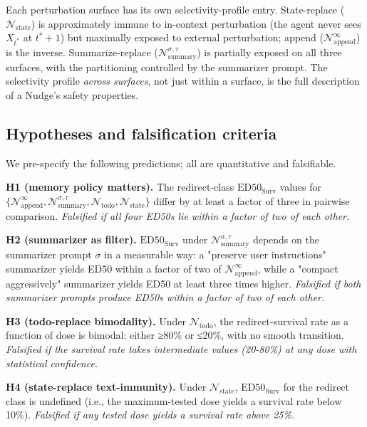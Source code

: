 \documentclass{article}
\theoremstyle{plain}
\theoremstyle{definition}
\begin{document}
Each perturbation surface has its own selectivity-profile entry. State-replace ($\mathcal{N}_\text{state}$) is approximately immune to in-context perturbation (the agent never sees $X_{t^*}$ at $t^* + 1$) but maximally exposed to external perturbation; append ($\mathcal{N}_\text{append}^\infty$) is the inverse. Summarize-replace ($\mathcal{N}_\text{summary}^{\sigma, \tau}$) is partially exposed on all three surfaces, with the partitioning controlled by the summarizer prompt. The selectivity profile \textit{across surfaces}, not just within a surface, is the full description of a Nudge's safety properties.

\subsection{Hypotheses and falsification criteria}

We pre-specify the following predictions; all are quantitative and falsifiable.

\textbf{H1 (memory policy matters).} The redirect-class $\text{ED50}_\text{Surv}$ values for $\{\mathcal{N}_\text{append}^\infty, \mathcal{N}_\text{summary}^{\sigma, \tau}, \mathcal{N}_\text{todo}, \mathcal{N}_\text{state}\}$ differ by at least a factor of three in pairwise comparison. \textit{Falsified if all four ED50s lie within a factor of two of each other.}

\textbf{H2 (summarizer as filter).} $\text{ED50}_\text{Surv}$ under $\mathcal{N}_\text{summary}^{\sigma, \tau}$ depends on the summarizer prompt $\sigma$ in a measurable way: a "preserve user instructions" summarizer yields ED50 within a factor of two of $\mathcal{N}_\text{append}^\infty$, while a "compact aggressively" summarizer yields ED50 at least three times higher. \textit{Falsified if both summarizer prompts produce ED50s within a factor of two of each other.}

\textbf{H3 (todo-replace bimodality).} Under $\mathcal{N}_\text{todo}$, the redirect-survival rate as a function of dose is bimodal: either ≥80\% or ≤20\%, with no smooth transition. \textit{Falsified if the survival rate takes intermediate values (20-80\%) at any dose with statistical confidence.}

\textbf{H4 (state-replace text-immunity).} Under $\mathcal{N}_\text{state}$, $\text{ED50}_\text{Surv}$ for the redirect class is undefined (i.e., the maximum-tested dose yields a survival rate below 10\%). \textit{Falsified if any tested dose yields a survival rate above 25\%.}
\end{document}
